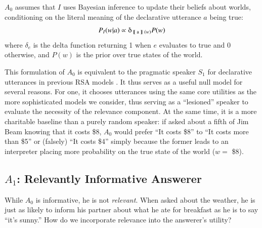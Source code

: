 \documentclass[11pt, floatsintext]{apa6}
\newcommand{\den}[2][]{
\(
\left\llbracket\;\text{#2}\;\right\rrbracket^{#1}
\)
}
\begin{document}
$A_0$ assumes that $I$ uses Bayesian inference to update their beliefs about worlds, conditioning on the literal meaning of the declarative utterance $a$ being true:
$$P_I(w|a) \propto \delta_{\textrm{\den{a}}(w)} P(w)$$
where $\delta_{e}$ is the delta function returning 1 when $e$ evaluates to true and 0 otherwise, and $P(w)$ is the prior over true states of the world. 

This formulation of $A_0$ is equivalent to the pragmatic speaker $S_1$ for declarative utterances in previous RSA models \cite{GoodmanFrank16_RSATiCS}. 
It thus serves as a useful null model for several reasons. 
For one, it chooses utterances using the same core utilities as the more sophisticated models we consider, thus serving as a ``lesioned'' speaker to evaluate the necessity of the relevance component. 
At the same time, it is a more charitable baseline than a purely random speaker: if asked about a fifth of Jim Beam knowing that it costs \$8, $A_0$ would prefer ``It costs \$8'' to ``It costs more than \$5'' or (falsely) ``It costs \$4'' simply because the former leads to an interpreter placing more probability on the true state of the world ($w = $ \$8).


\subsection{$A_1$: Relevantly Informative Answerer}

While $A_0$ is informative, he is not \emph{relevant}. When asked about the weather, he is just as likely to inform his partner about what he ate for breakfast as he is to say ``it's sunny.'' How do we incorporate relevance into the answerer's utility? 
\end{document}
